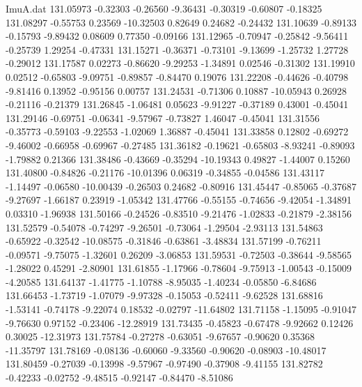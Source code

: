 \begin{filecontents}{ImuA.dat}
 131.05973   -0.32303   -0.26560   -9.36431   -0.30319   -0.60807   -0.18325
 131.08297   -0.55753    0.23569  -10.32503    0.82649    0.24682   -0.24432
 131.10639   -0.89133   -0.15793   -9.89432    0.08609    0.77350   -0.09166
 131.12965   -0.70947   -0.25842   -9.56411   -0.25739    1.29254   -0.47331
 131.15271   -0.36371   -0.73101   -9.13699   -1.25732    1.27728   -0.29012
 131.17587    0.02273   -0.86620   -9.29253   -1.34891    0.02546   -0.31302
 131.19910    0.02512   -0.65803   -9.09751   -0.89857   -0.84470    0.19076
 131.22208   -0.44626   -0.40798   -9.81416    0.13952   -0.95156    0.00757
 131.24531   -0.71306    0.10887  -10.05943    0.26928   -0.21116   -0.21379
 131.26845   -1.06481    0.05623   -9.91227   -0.37189    0.43001   -0.45041
 131.29146   -0.69751   -0.06341   -9.57967   -0.73827    1.46047   -0.45041
 131.31556   -0.35773   -0.59103   -9.22553   -1.02069    1.36887   -0.45041
 131.33858    0.12802   -0.69272   -9.46002   -0.66958   -0.69967   -0.27485
 131.36182   -0.19621   -0.65803   -8.93241   -0.89093   -1.79882    0.21366
 131.38486   -0.43669   -0.35294  -10.19343    0.49827   -1.44007    0.15260
 131.40800   -0.84826   -0.21176  -10.01396    0.06319   -0.34855   -0.04586
 131.43117   -1.14497   -0.06580  -10.00439   -0.26503    0.24682   -0.80916
 131.45447   -0.85065   -0.37687   -9.27697   -1.66187    0.23919   -1.05342
 131.47766   -0.55155   -0.74656   -9.42054   -1.34891    0.03310   -1.96938
 131.50166   -0.24526   -0.83510   -9.21476   -1.02833   -0.21879   -2.38156
 131.52579   -0.54078   -0.74297   -9.26501   -0.73064   -1.29504   -2.93113
 131.54863   -0.65922   -0.32542  -10.08575   -0.31846   -0.63861   -3.48834
 131.57199   -0.76211   -0.09571   -9.75075   -1.32601    0.26209   -3.06853
 131.59531   -0.72503   -0.38644   -9.58565   -1.28022    0.45291   -2.80901
 131.61855   -1.17966   -0.78604   -9.75913   -1.00543   -0.15009   -4.20585
 131.64137   -1.41775   -1.10788   -8.95035   -1.40234   -0.05850   -6.84686
 131.66453   -1.73719   -1.07079   -9.97328   -0.15053   -0.52411   -9.62528
 131.68816   -1.53141   -0.74178   -9.22074    0.18532   -0.02797  -11.64802
 131.71158   -1.15095   -0.91047   -9.76630    0.97152   -0.23406  -12.28919
 131.73435   -0.45823   -0.67478   -9.92662    0.12426    0.30025  -12.31973
 131.75784   -0.27278   -0.63051   -9.67657   -0.90620    0.35368  -11.35797
 131.78169   -0.08136   -0.60060   -9.33560   -0.90620   -0.08903  -10.48017
 131.80459   -0.27039   -0.13998   -9.57967   -0.97490   -0.37908   -9.41155
 131.82782   -0.42233   -0.02752   -9.48515   -0.92147   -0.84470   -8.51086

\end{filecontents}
